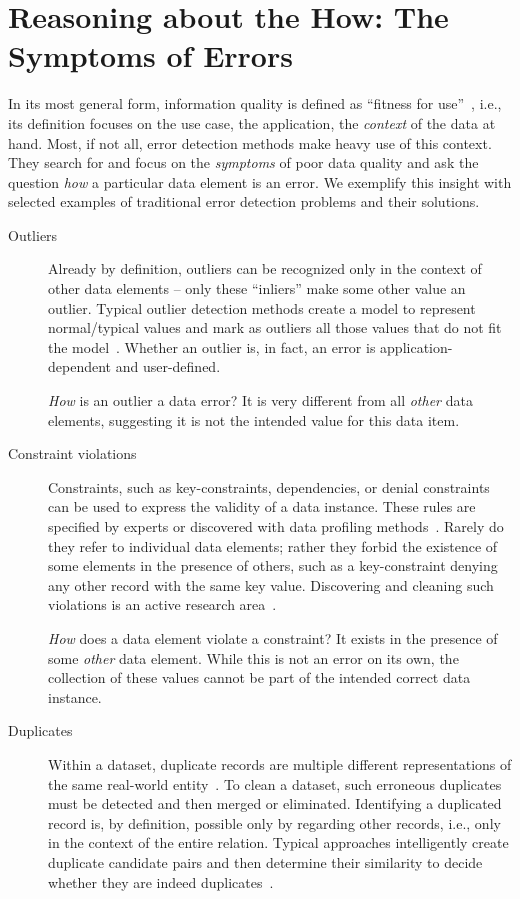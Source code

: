 \section{Reasoning about the How: The Symptoms of Errors}
\label{sec:how}

In its most general form, information quality is defined as ``fitness for use''~\cite{Strong96}, i.e., its definition focuses on the use case, the application, the \emph{context} of the data at hand. Most, if not all, error detection methods make heavy use of this context. They search for and focus on the \emph{symptoms} of poor data quality and ask the question \emph{how} a particular data element is an error.
We exemplify this insight with selected examples of traditional error detection problems and their solutions.
\begin{description}
  \item[Outliers] Already by definition, outliers can be recognized only in the context of other data elements -- only these ``inliers'' make some other value an outlier. Typical outlier detection methods create a model to represent normal/typical values and mark as outliers all those values that do not fit the model~\cite{Aggarwal2013}. Whether an outlier is, in fact, an error is application-dependent and user-defined.
  
  \emph{How} is an outlier a data error? It is very different from all \emph{other} data elements, suggesting it is not the intended value for this data item.
  
  \item[Constraint violations] Constraints, such as key-constraints, dependencies, or denial constraints can be used to express the validity of a data instance. These rules are specified by experts or discovered with data profiling methods~\cite{Abedjan2018}. Rarely do they refer to individual data elements; rather they forbid the existence of some elements in the presence of others, such as a key-constraint denying any other record with the same key value. Discovering and cleaning such violations is an active research area~\cite{IlyasC15}.
  
  \emph{How} does a data element violate a constraint? It exists in the presence of some \emph{other} data element. While this is not an error on its own, the collection of these values cannot be part of the intended correct data instance. %
  
  \item[Duplicates] Within a dataset, duplicate records are multiple different representations of the same real-world entity~\cite{Naumann10}. To clean a dataset, such erroneous duplicates must be detected and then merged or eliminated. Identifying a duplicated record is, by definition, possible only by regarding other records, i.e., only in the context of the entire relation. Typical approaches intelligently create duplicate candidate pairs and then determine their similarity to decide whether they are indeed duplicates~\cite{Papadakis21}.
  

\end{description}
